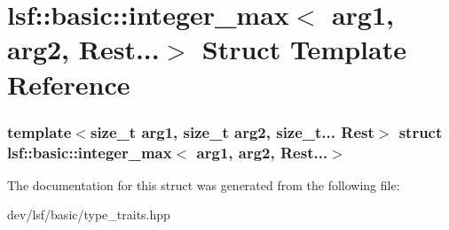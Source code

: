\hypertarget{structlsf_1_1basic_1_1integer__max_3_01arg1_00_01arg2_00_01Rest_8_8_8_4}{
\section{lsf::basic::integer\_\-max$<$ arg1, arg2, Rest...$>$ Struct Template Reference}
\label{structlsf_1_1basic_1_1integer__max_3_01arg1_00_01arg2_00_01Rest_8_8_8_4}
}
\subsubsection*{template$<$size\_\-t arg1, size\_\-t arg2, size\_\-t... Rest$>$ struct lsf::basic::integer\_\-max$<$ arg1, arg2, Rest...$>$}



The documentation for this struct was generated from the following file:\begin{DoxyCompactItemize}
\item 
dev/lsf/basic/type\_\-traits.hpp\end{DoxyCompactItemize}
